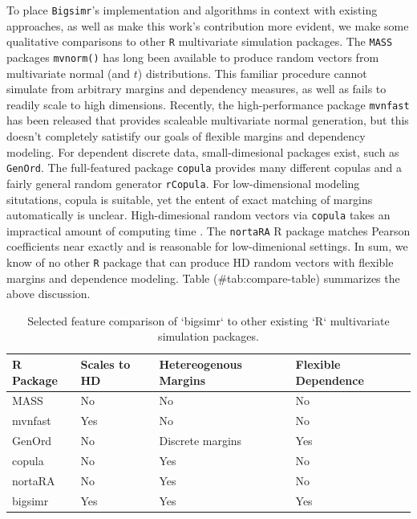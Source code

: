 \documentclass[
]{jss}
\begin{document}
To place \texttt{Bigsimr}'s implementation and algorithms in context
with existing approaches, as well as make this work's contribution more
evident, we make some qualitative comparisons to other \texttt{R}
multivariate simulation packages. The \texttt{MASS} packages
\texttt{mvnorm()} has long been available to produce random vectors from
multivariate normal (and \(t\)) distributions. This familiar procedure
cannot simulate from arbitrary margins and dependency measures, as well
as fails to readily scale to high dimensions. Recently, the
high-performance package \texttt{mvnfast} has been released that
provides scaleable multivariate normal generation, but this doesn't
completely satistify our goals of flexible margins and dependency
modeling. For dependent discrete data, small-dimesional packages exist,
such as \texttt{GenOrd}. The full-featured package \texttt{copula}
provides many different copulas and a fairly general random generator
\texttt{rCopula}. For low-dimensional modeling situtations, copula is
suitable, yet the entent of exact matching of margins automatically is
unclear. High-dimesional random vectors via \texttt{copula} takes an
impractical amount of computing time \citep{Li2019gpu}. The
\texttt{nortaRA} R package matches Pearson coefficients near exactly and
is reasonable for low-dimenional settings. In sum, we know of no other
\texttt{R} package that can produce HD random vectors with flexible
margins and dependence modeling. Table (\#tab:compare-table) summarizes
the above discussion.

\begin{table}[]
\centering
\caption{Selected feature comparison of `bigsimr` to other existing `R` multivariate simulation packages.}
\label{tab:compare-table}
\begin{tabular}{@{}llll@{}}
R Package & Scales to HD & Hetereogenous Margins & Flexible Dependence \\ \midrule
MASS      & No           & No                    & No                  \\
mvnfast   & Yes          & No                    & No                  \\
GenOrd    & No           & Discrete margins      & Yes                 \\
copula    & No           & Yes                   & No                  \\
nortaRA   & No           & Yes                   & No                  \\
bigsimr   & Yes          & Yes                   & Yes                
\end{tabular}
\end{table}
\end{document}
